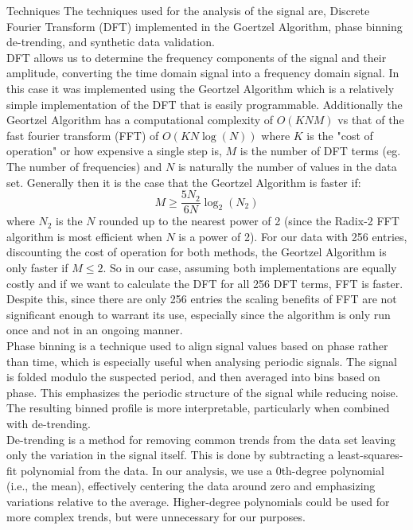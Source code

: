 \documentclass[reqno]{amsart}
\makeatletter
\renewcommand\subsection{\@startsection{subsection}{2}%
  \z@{.5\linespacing\@plus.7\linespacing}{-.5em}%
  {\normalfont\scshape\justify}}
\numberwithin{equation}{section}
\numberwithin{figure}{section}
\makeatother
\begin{document}
\subsection{Techniques}
The techniques used for the analysis of the signal are, Discrete Fourier Transform (DFT) implemented in the Goertzel Algorithm, phase binning de-trending, and synthetic data validation. \\

DFT allows us to determine the frequency components of the signal and their amplitude, converting the time domain signal into a frequency domain signal. In this case it was implemented using the Geortzel Algorithm which is a relatively simple implementation of the DFT that is easily programmable. Additionally the Geortzel Algorithm has a computational complexity of $O(KNM)$ vs that of the fast fourier transform (FFT) of $O(KN\log(N))$ where $K$ is the "cost of operation" or how expensive a single step is, $M$ is the number of DFT terms (eg. The number of frequencies) and $N$ is naturally the number of values in the data set. Generally then it is the case that the Geortzel Algorithm is faster if:
\begin{equation}
    M \geq \frac{5N_2}{6N}\log_2(N_2)
    \label{eq:geortzel-vs-fft}
\end{equation}
where $N_2$ is the $N$ rounded up to the nearest power of 2 (since the Radix-2 FFT algorithm is most efficient when $N$ is a power of 2). For our data with 256 entries, discounting the cost of operation for both methods, the Geortzel Algorithm is only faster if $M \leq 2$. So in our case, assuming both implementations are equally costly and if we want to calculate the DFT for all 256 DFT terms, FFT is faster. Despite this, since there are only 256 entries the scaling benefits of FFT are not significant enough to warrant its use, especially since the algorithm is only run once and not in an ongoing manner. \\

Phase binning is a technique used to align signal values based on phase rather than time, which is especially useful when analysing periodic signals. The signal is folded modulo the suspected period, and then averaged into bins based on phase. This emphasizes the periodic structure of the signal while reducing noise. The resulting binned profile is more interpretable, particularly when combined with de-trending. \\

De-trending is a method for removing common trends from the data set leaving only the variation in the signal itself. This is done by subtracting a least-squares-fit polynomial from the data. In our analysis, we use a 0th-degree polynomial (i.e., the mean), effectively centering the data around zero and emphasizing variations relative to the average. Higher-degree polynomials could be used for more complex trends, but were unnecessary for our purposes. \\
\end{document}
